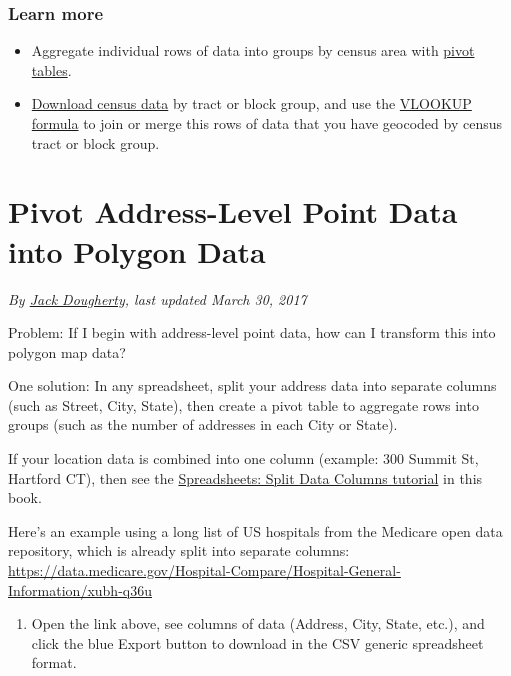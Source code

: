 \documentclass[
  english,
]{book}
\providecommand{\tightlist}{%
  \setlength{\itemsep}{0pt}\setlength{\parskip}{0pt}}
\begin{document}
\hypertarget{learn-more-18}{%
\subsubsection*{Learn more}\label{learn-more-18}}

\begin{itemize}
\tightlist
\item
  Aggregate individual rows of data into groups by census area with \href{pivot}{pivot tables}.
\item
  \href{find}{Download census data} by tract or block group, and use the \href{vlookup/}{VLOOKUP formula} to join or merge this rows of data that you have geocoded by census tract or block group.
\end{itemize}

\hypertarget{pivot-point-to-polygon}{%
\section{Pivot Address-Level Point Data into Polygon Data}\label{pivot-point-to-polygon}}

\emph{By \href{authors}{Jack Dougherty}, last updated March 30, 2017}

Problem: If I begin with address-level point data, how can I transform this into polygon map data?

One solution: In any spreadsheet, split your address data into separate columns (such as Street, City, State), then create a pivot table to aggregate rows into groups (such as the number of addresses in each City or State).

If your location data is combined into one column (example: 300 Summit St, Hartford CT), then see the \href{clean-spreadsheets}{Spreadsheets: Split Data Columns tutorial} in this book.

Here's an example using a long list of US hospitals from the Medicare open data repository, which is already split into separate columns: \url{https://data.medicare.gov/Hospital-Compare/Hospital-General-Information/xubh-q36u}

\begin{enumerate}
\def\labelenumi{\arabic{enumi})}
\tightlist
\item
  Open the link above, see columns of data (Address, City, State, etc.), and click the blue Export button to download in the CSV generic spreadsheet format.
\end{enumerate}
\end{document}
